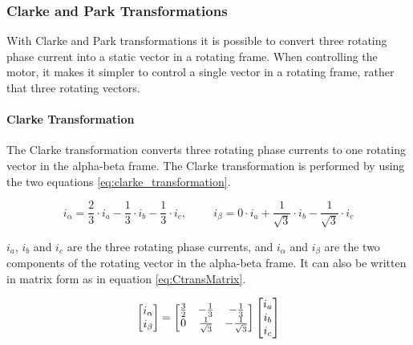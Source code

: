 
\subsubsection{Clarke and Park Transformations}
With Clarke and Park transformations it is possible to convert three rotating phase current into a static vector in a rotating frame. When controlling the motor, it makes it simpler to control a single vector in a rotating frame, rather that three rotating vectors.



\paragraph{Clarke Transformation}
The Clarke transformation converts three rotating phase currents to one rotating vector in the alpha-beta frame. The Clarke transformation is performed by using the two equations \ref{eq:clarke_transformation}.

\begin{equation}
    i_{\alpha} = \frac{2}{3} \cdot i_a - \frac{1}{3} \cdot i_b - \frac{1}{3} \cdot i_c
    , \hspace{1cm}
    i_{\beta} = 0 \cdot i_a + \frac{1}{\sqrt{3}} \cdot i_b - \frac{1}{\sqrt{3}} \cdot i_c
    \label{eq:clarke_transformation}
\end{equation}

$i_a$, $i_b$ and $i_c$ are the three rotating phase currents, and $i_\alpha$ and $i_\beta$ are the two components of the rotating vector in the alpha-beta frame.
It can also be written in matrix form as in equation \ref{eq:CtransMatrix}. 

\begin{equation}
    \centering
    \begin{bmatrix}
        i_{\alpha} \\ 
        i_{\beta}
    \end{bmatrix}
    =
    \begin{bmatrix}
        \frac{3}{2} & -\frac{1}{3} & -\frac{1}{3} \\
        0 & \frac{1}{\sqrt{3}} & -\frac{1}{\sqrt{3}} \\
    \end{bmatrix}
    \begin{bmatrix}
        i_{a} \\ 
        i_{b} \\ 
        i_{c}
    \end{bmatrix}
    \label{eq:CtransMatrix}
\end{equation}


